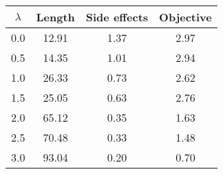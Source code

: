 \begin{tabular}{c|c|c|c}
\toprule
 $\lambda$ &  Length &  Side effects &  Objective \\
\midrule
       0.0 &   12.91 &          1.37 &       2.97 \\
       0.5 &   14.35 &          1.01 &       2.94 \\
       1.0 &   26.33 &          0.73 &       2.62 \\
       1.5 &   25.05 &          0.63 &       2.76 \\
       2.0 &   65.12 &          0.35 &       1.63 \\
       2.5 &   70.48 &          0.33 &       1.48 \\
       3.0 &   93.04 &          0.20 &       0.70 \\
\bottomrule
\end{tabular}
